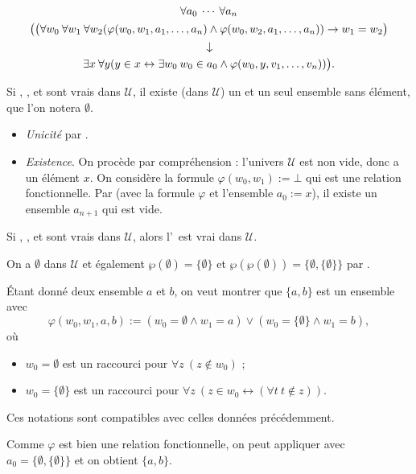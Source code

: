 \documentclass[./main]{subfiles}
\begin{document}
  \begin{gather*}
    \forall a_0 \: \cdots \: \forall a_n \\
\big(\big(
      \forall w_0 \: \forall w_1 \: \forall w_2 
        (\varphi(w_0, w_1, a_1, \ldots, a_n) \land \varphi(w_0, w_2, a_1, \ldots, a_n)) \to w_1 = w_2
      \big)\\
      \vertical\to\\
      \exists x \: \forall y (y \in x \leftrightarrow \exists w_0 \: w_0 \in a_0 \land \varphi(w_0, y, v_1, \ldots, v_n))\big)
  .\end{gather*}

  \begin{thm}
    Si , ,  et  sont vrais dans  $\mathcal{U}$, il existe (dans $\mathcal{U}$) un et un seul ensemble sans élément, que l'on notera $\emptyset$.
  \end{thm}
  \begin{prv}
    \begin{itemize}
      \item \textit{Unicité} par .
      \item \textit{Existence}.
        On procède par compréhension : l'univers $\mathcal{U}$ est non vide, donc a un élément $x$.
        On considère la formule $\varphi(w_0, w_1) := \bot$ qui est une relation fonctionnelle.
        Par  (avec la formule $\varphi$ et l'ensemble  $a_0 := x$), il existe un ensemble $a_{n+1}$ qui est vide.
    \end{itemize}
  \end{prv}

  \begin{prop}
    Si , ,  et  sont vrais dans  $\mathcal{U}$, alors l'\pairaxiom\ est vrai dans $\mathcal{U}$.
  \end{prop}
  \begin{prv}
    On a $\emptyset$ dans $\mathcal{U}$ et également $\wp(\emptyset) = \{\emptyset\}$ et $\wp(\wp(\emptyset)) = \{\emptyset, \{\emptyset\}\}$ par .

    Étant donné deux ensemble $a$ et $b$, on veut montrer que $\{a,b\}$ est un ensemble avec  \[
    \varphi(w_0, w_1, a, b) := (w_0 = \emptyset \land w_1 = a) \lor (w_0 = \{\emptyset\} \land w_1 = b)
    ,\]
    où 
    \begin{itemize}
      \item $w_0 = \emptyset$ est un raccourci pour $\forall z \: (z \not\in w_0)$ ;
      \item $w_0 = \{\emptyset\} $ est un raccourci pour $\forall z \: (z \in w_0 \leftrightarrow (\forall t \: t \not\in z))$.
    \end{itemize}
    Ces notations sont compatibles avec celles données précédemment.

    Comme  $\varphi$ est bien une relation fonctionnelle, on peut appliquer  avec $a_0 = \{\emptyset, \{\emptyset\}\}$ et on obtient $\{a, b\}$.
  \end{prv}
\end{document}
